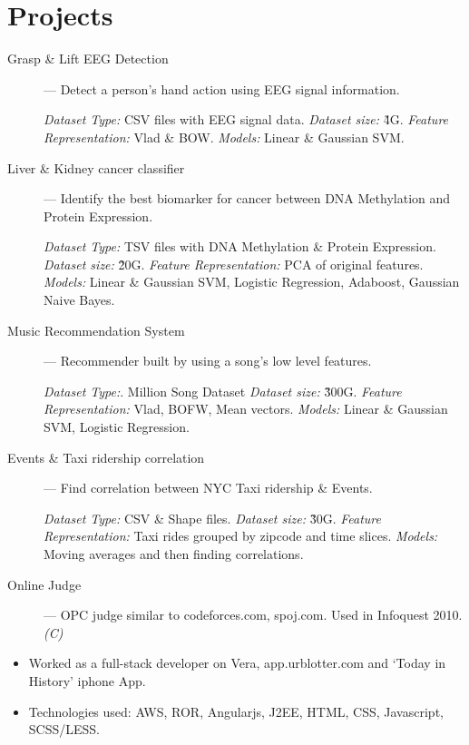 \documentclass{resume}
\begin{document}
\section{Projects}
  \begin{description}
    \item[Grasp \& Lift EEG Detection] --- Detect a person's hand action using EEG signal information.
      \par \textit{Dataset Type:} CSV files with EEG signal data.  \textit{Dataset size:} \~4G.  \textit{Feature Representation:} Vlad \& BOW\@.  \textit{Models:} Linear \& Gaussian SVM\@.
    \item[Liver \& Kidney cancer classifier] --- Identify the best biomarker for cancer between DNA Methylation and Protein Expression.
      \par \textit{Dataset Type:} TSV files with DNA Methylation \& Protein Expression.  \textit{Dataset size:} \~20G.  \textit{Feature Representation:} PCA of original features.  \textit{Models:} Linear \& Gaussian SVM\@, Logistic Regression, Adaboost, Gaussian Naive Bayes.
    \item[Music Recommendation System] --- Recommender built by using a song's low level features.
      \par \textit{Dataset Type:}. Million Song Dataset  \textit{Dataset size:} \~300G.  \textit{Feature Representation:} Vlad, BOFW, Mean vectors.  \textit{Models:} Linear \& Gaussian SVM, Logistic Regression.
    \item[Events \& Taxi ridership correlation] --- Find correlation between NYC Taxi ridership \& Events.
      \par \textit{Dataset Type:} CSV \& Shape files. \textit{Dataset size:} \~30G. \textit{Feature Representation:} Taxi rides grouped by zipcode and time slices.  \textit{Models:} Moving averages and then finding correlations.
    \item[Online Judge] --- OPC judge similar to codeforces.com, spoj.com.  Used in Infoquest 2010. \textit{(C)}
  \end{description}


\begin{itemize} \itemsep1pt \parskip0pt
  \item Worked as a full-stack developer on Vera, app.urblotter.com and `Today in History' iphone App.
  \item Technologies used: AWS, ROR, Angularjs, J2EE, HTML, CSS, Javascript, SCSS/LESS\@.
\end{itemize}
\end{document}
